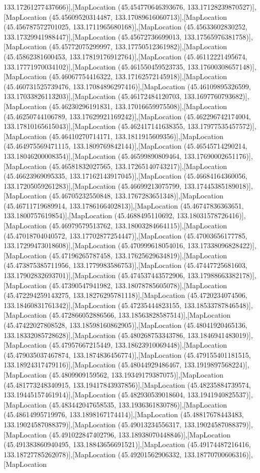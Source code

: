 133.17261277437666)],[MapLocation (45.454770646393676, 133.17128239870527)],[MapLocation (45.45609520314487, 133.17089616060713)],[MapLocation (45.456787572701025, 133.1711965680168)],[MapLocation (45.45633602830252, 133.17329941988447)],[MapLocation (45.45672736699013, 133.17565976381758)],[MapLocation (45.45772075299997, 133.17750512361982)],[MapLocation (45.45862381600453, 133.17819176912764)],[MapLocation (45.46112221495674, 133.17771970034102)],[MapLocation (45.461550459523735, 133.17600308657148)],[MapLocation (45.46067754416322, 133.17162572145918)],[MapLocation (45.460731525739476, 133.17084896297416)],[MapLocation (45.46109895326599, 133.17033826113203)],[MapLocation (45.46172484120703, 133.1697760793682)],[MapLocation (45.46230296191831, 133.17016659975508)],[MapLocation (45.46250744106789, 133.17629921169242)],[MapLocation (45.462296742174004, 133.17810165615043)],[MapLocation (45.462417141638355, 133.17977535457572)],[MapLocation (45.46410270714171, 133.1811915609356)],[MapLocation (45.464975569471115, 133.1809769842144)],[MapLocation (45.46545714290214, 133.18046200008354)],[MapLocation (45.46599890809464, 133.17690002651176)],[MapLocation (45.46581832027565, 133.17265140743217)],[MapLocation (45.46623969095335, 133.17162143917045)],[MapLocation (45.46684164360056, 133.17205059261283)],[MapLocation (45.46699213075799, 133.17445385189018)],[MapLocation (45.46705232550848, 133.1767283651348)],[MapLocation (45.46711719689914, 133.1786166402813)],[MapLocation (45.46747836363651, 133.1800757619854)],[MapLocation (45.4688495110692, 133.18031578726416)],[MapLocation (45.46979579513762, 133.18003284664115)],[MapLocation (45.47018704040572, 133.17702877254447)],[MapLocation (45.47003656177785, 133.17299473018608)],[MapLocation (45.470999618054016, 133.17338096828422)],[MapLocation (45.47196265787458, 133.17625629634819)],[MapLocation (45.473875385711956, 133.1779983586753)],[MapLocation (45.47447725681603, 133.17902832693701)],[MapLocation (45.474537443572906, 133.17988663382178)],[MapLocation (45.47390547941982, 133.18078785605078)],[MapLocation (45.472294259143275, 133.18276295781118)],[MapLocation (45.4720234074506, 133.18460831761342)],[MapLocation (45.47235444823155, 133.18533787846548)],[MapLocation (45.472866052886566, 133.18563828587514)],[MapLocation (45.47422027808528, 133.18598160862905)],[MapLocation (45.48041920465136, 133.18332085728628)],[MapLocation (45.480268753343786, 133.1846941483019)],[MapLocation (45.47957667215449, 133.18623910069448)],[MapLocation (45.479035037467874, 133.1874836456774)],[MapLocation (45.479155401181515, 133.18924317479116)],[MapLocation (45.48044929486467, 133.1919897568224)],[MapLocation (45.4809909159562, 133.19349179387075)],[MapLocation (45.481773248340915, 133.19417843937856)],[MapLocation (45.48235884739574, 133.19445157461914)],[MapLocation (45.482930539018604, 133.1941940825537)],[MapLocation (45.483442047658535, 133.1936361830786)],[MapLocation (45.48614995719976, 133.1898167174414)],[MapLocation (45.48817678443483, 133.19024587088379)],[MapLocation (45.49013234556317, 133.19024587088379)],[MapLocation (45.491022847402796, 133.18938070448846)],[MapLocation (45.491383860940495, 133.18843656691521)],[MapLocation (45.49174487216416, 133.18727785262078)],[MapLocation (45.49201562906332, 133.18770700606316)],[MapLocation 